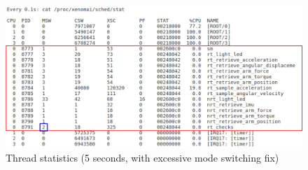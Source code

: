 \documentclass[12pt]{scrreprt}
\begin{document}
\begin{figure}[H]
    \centering
    \includegraphics[width=\textwidth]{Figures/results/stat/5sec_good_with_frames.png}
    \caption{Thread statistics (5 seconds, with excessive mode switching fix)}
    \label{fig:5sec_good}
\end{figure}
\end{document}
